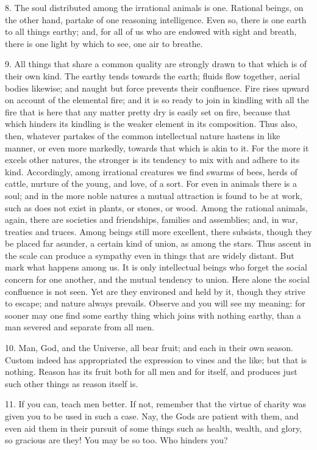 \documentclass{book}
\begin{document}
8. The soul distributed among the irrational animals is one. Rational
beings, on the other hand, partake of one reasoning intelligence. Even
so, there is one earth to all things earthy; and, for all of us who
are endowed with sight and breath, there is one light by which to see,
one air to breathe.

9. All things that share a common quality are strongly drawn to that
which is of their own kind. The earthy tends towards the earth; fluids
flow together, aerial bodies likewise; and naught but force prevents
their confluence. Fire rises upward on account of the elemental fire;
and it is so ready to join in kindling with all the fire that is here
that any matter pretty dry is easily set on fire, because that which
hinders its kindling is the weaker element in its composition. Thus
also, then, whatever partakes of the common intellectual nature
hastens in like manner, or even more markedly, towards that which is
akin to it. For the more it excels other natures, the stronger is its
tendency to mix with and adhere to its kind. Accordingly, among
irrational creatures we find swarms of bees, herds of cattle, nurture
of the young, and love, of a sort. For even in animals there is a
soul; and in the more noble natures a mutual attraction is found to be
at work, such as does not exist in plants, or stones, or wood. Among
the rational animals, again, there are societies and friendships,
families and assemblies; and, in war, treaties and truces. Among
beings still more excellent, there subsists, though they be placed far
asunder, a certain kind of union, as among the stars. Thus ascent in
the scale can produce a sympathy even in things that are widely
distant. But mark what happens among us. It is only intellectual
beings who forget the social concern for one another, and the mutual
tendency to union. Here alone the social confluence is not seen. Yet
are they environed and held by it, though they strive to escape; and
nature always prevails. Observe and you will see my meaning: for
sooner may one find some earthy thing which joins with nothing earthy,
than a man severed and separate from all men.

10. Man, God, and the Universe, all bear fruit; and each in their own
season. Custom indeed has appropriated the expression to vines and the
like; but that is nothing. Reason has its fruit both for all men and
for itself, and produces just such other things as reason itself is.

11. If you can, teach men better. If not, remember that the virtue of
charity was given you to be used in such a case. Nay, the Gods are
patient with them, and even aid them in their pursuit of some things
such as health, wealth, and glory, so gracious are they! You may be so
too. Who hinders you?
\end{document}
